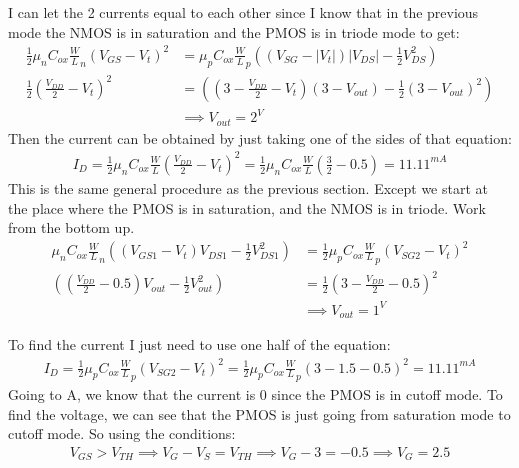 \documentclass[12pt,letterpaper]{article} \usepackage{amsmath} \usepackage{graphicx} \usepackage[margin=1in]{geometry} \usepackage{longtable}  \usepackage{amssymb}
\begin{document}
\begin{mdframed}
		I can let the 2 currents equal to each other since I know that in the previous mode the NMOS is in saturation and the PMOS is in triode mode to get:
		\begin{align*}
			\frac{1}{2}\mu_n C_{ox}\frac{W}{L}_n (V_{GS} - V_t)^2 &= \mu_p C_{ox} \frac{W}{L}_p \left((V_{SG} - |V_t|)|V_{DS}|-\frac{1}{2}V_{DS}^2\right)\\
			\frac{1}{2}(\frac{V_{DD}}{2} - V_t)^2&=\left((3-\frac{V_{DD}}{2} - V_t)(3-V_{out})-\frac{1}{2}(3-V_{out})^2\right)\\
			&\implies V_{out} = 2^V
		\end{align*}
		Then the current can be obtained by just taking one of the sides of that equation:
		\begin{align*}
			I_D = \frac{1}{2}\mu_n C_{ox}\frac{W}{L}\left(\frac{V_{DD}}{2}-V_t\right)^2 = \frac{1}{2}\mu_n C_{ox}\frac{W}{L}\left(\frac{3}{2}-0.5\right) = 11.11^{mA}
		\end{align*}
		This is the same general procedure as the previous section. Except we start at the place where the PMOS is in saturation, and the NMOS is in triode. Work from the bottom up. 
		\begin{align*}
			\mu_n C_{ox} \frac{W}{L}_n \left((V_{GS1}-V_t)V_{DS1} - \frac{1}{2}V_{DS1}^2\right) &= \frac{1}{2}\mu_p C_{ox} \frac{W}{L}_p (V_{SG2} - V_t)^2\\
			\left((\frac{V_{DD}}{2}-0.5)V_{out} - \frac{1}{2}V_{out}^2\right) &= \frac{1}{2}(3-\frac{V_{DD}}{2}-0.5)^2\\
			&\implies V_{out} = 1^V
		\end{align*}
		
		To find the current I just need to use one half of the equation:
		\begin{align*}
			I_D = \frac{1}{2}\mu_p C_{ox} \frac{W}{L}_p (V_{SG2} - V_t)^2 = \frac{1}{2}\mu_p C_{ox} \frac{W}{L}_p (3-1.5 - 0.5)^2 = 11.11^{mA}
		\end{align*}
		Going to A, we know that the current is 0 since the PMOS is in cutoff mode. To find the voltage, we can see that the PMOS is just going from saturation mode to cutoff mode. So using the conditions:
		\begin{align*}
			V_{GS} > V_{TH} \implies V_{G}-V_{S} = V_{TH} \implies V_G - 3 = -0.5 \implies V_G = 2.5
		\end{align*}
		

\end{mdframed}
\end{document}
